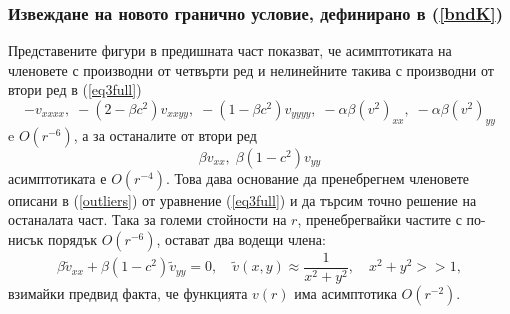 \documentclass[a4paper]{article}
\newcommand{\be}{\begin{equation}}
\newcommand{\ee}{\end{equation}}
\newcommand{\rf}[1]{(\ref{#1})}
\theoremstyle{remark}
\begin{document}
\subsubsection{Извеждане на новото гранично условие, дефинирано в \rf{bndK} }
Представените фигури в предишната част показват, че асимптотиката на членовете с производни от четвърти ред и нелинейните такива с производни от втори ред в \rf{eq3full}
\be\label{outliers}
- v_{xxxx}, \;  - (2-\beta c^2)v_{xxyy},  \;  - (1-\beta c^2)v_{yyyy}, \;  - \alpha \beta (v^2)_{xx}, \; - \alpha \beta (v^2)_{yy}
\ee
e $O(r^{-6})$, а за останалите от втори ред
$$
\beta v_{xx}, \; \beta (1-c^2) v_{yy}
$$
асимптотиката е $O(r^{-4})$. Това дава основание да пренебрегнем членовете описани в \rf{outliers} от уравнение \rf{eq3full} и да търсим точно решение на останалата част. Така за големи стойности на $r$, пренебрегвайки частите с по-нисък порядък $O(r^{-6})$, остават два водещи члена:
\be\label{asymptEq}
\beta \tilde v_{xx} + \beta (1-c^2) \tilde v_{yy} =0, \quad \tilde v(x,y) \approx \frac{1}{x^2 + y^2}, \quad x^2 + y^2 >>1,
\ee
взимайки предвид факта, че функцията $v(r)$ има асимптотика $O(r^{-2})$.
\end{document}
